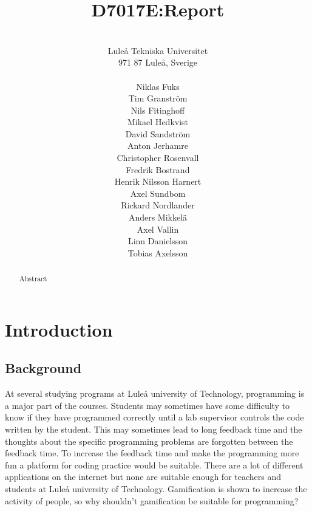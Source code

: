 \documentclass[a4paper,12pt]{article}
\title{D7017E:\@ Report}
\begin{document}
\author{  \\ Luleå Tekniska Universitet\\ 
971 87 Luleå, Sverige\\  
\\ Niklas Fuks
\\ Tim Granström 
\\ Nils Fitinghoff 
\\ Mikael Hedkvist 
\\ David Sandström 
\\ Anton Jerhamre
\\ Christopher Rosenvall
\\ Fredrik Bostrand 
\\ Henrik Nilsson Harnert 
\\ Axel Sundbom 
\\ Rickard Nordlander 
\\ Anders Mikkelä 
\\ Axel Vallin
\\ Linn Danielsson
\\ Tobias Axelsson
}
\maketitle
\thispagestyle{empty}
\newpage
\thispagestyle{empty}  
 \setcounter{page}{1}
\newpage
\thispagestyle{empty}  
 \begin{abstract}
Abstract
 \end{abstract}
\newpage

\tableofcontents{}
\thispagestyle{empty}
 \setcounter{page}{2}
 
 \newpage
 \setcounter{page}{3}

\section{Introduction}
\subsection{Background} 
At several studying programs at Luleå university of Technology, programming is a major part of the courses. Students may sometimes have some difficulty to know if they have programmed correctly until a lab supervisor controls the code written by the student. This may sometimes lead to long feedback time and the thoughts about the specific programming problems are forgotten between the feedback time. To increase the feedback time and make the programming more fun a platform for coding practice would be suitable. There are a lot of different applications on the internet but none are suitable enough for teachers and students at Luleå university of Technology. Gamification is shown to increase the activity of people, so why shouldn't gamification be suitable for programming? 
\end{document}
